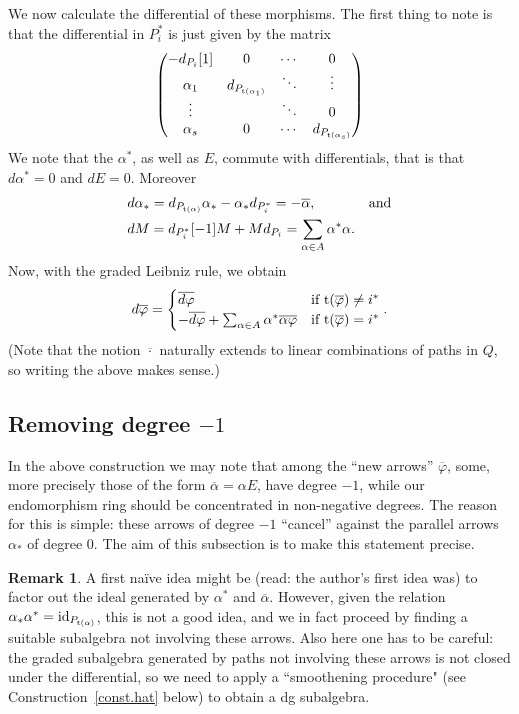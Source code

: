 \documentclass[a4paper,11pt]{amsart}
\theoremstyle{definition}
\newtheorem{remark}[theorem]{Remark}
\DeclareMathOperator{\id}{id}
\newcommand{\tail}{{\rm t}}
\numberwithin{theorem}{section}
\begin{document}
We now calculate the differential of these morphisms. The first thing to note is that the differential in $P_i^*$ is just given by the matrix
\[ \begin{pmatrix} -d_{P_i}[1] & 0 & \cdots & 0 \\ \alpha_1 & d_{P_{\tail(\alpha_1)}} & \ddots & \vdots \\ \vdots && \ddots & 0 \\ \alpha_s & 0 & \cdots & d_{P_{\tail(\alpha_s)}} \end{pmatrix} \]
We note that the $\alpha^*$, as well as $E$, commute with differentials, that is that $d \alpha^* = 0$ and $dE = 0$. Moreover
\begin{align*}
& d \alpha_* = d_{P_{\tail(\alpha)}} \alpha_* - \alpha_* d_{P_i^*} = - \overline{\alpha}, && \text{and} \\
& dM = d_{P_i^*}[-1] M + M d_{P_i} = \sum_{\alpha \in A} \alpha^* \alpha.
\end{align*}
Now, with the graded Leibniz rule, we obtain
\[ d \overline{\varphi} = \begin{cases} \overline{d \varphi} & \text{if } \tail(\overline{\varphi}) \neq i^* \\ - \overline{d\varphi} + \sum_{\alpha \in A} \alpha^* \overline{\alpha \varphi} & \text{if } \tail(\overline{\varphi}) = i^* \end{cases}. \]
(Note that the notion $\overline{\cdot}$ naturally extends to linear combinations of paths in $Q$, so writing the above makes sense.)

\subsection{Removing degree $-1$}

In the above construction we may note that among the ``new arrows'' $\overline{\varphi}$, some, more precisely those of the form $\overline{\alpha} = \alpha E$, have degree $-1$, while our endomorphism ring should be concentrated in non-negative degrees. The reason for this is simple: these arrows of degree $-1$ ``cancel'' against the parallel arrows $\alpha_*$ of degree $0$. The aim of this subsection is to make this statement precise.

\begin{remark}
A first na{\"i}ve idea might be (read: the author's first idea was) to factor out the ideal generated by $\alpha^*$ and $\overline{\alpha}$. However, given the relation $\alpha_* \alpha^* = \id_{P_{\tail(\alpha)}}$, this is not a good idea, and we in fact proceed by finding a suitable subalgebra not involving these arrows. Also here one has to be careful: the graded subalgebra generated by paths not involving these arrows is not closed under the differential, so we need to apply a ``smoothening procedure" (see Construction~\ref{const.hat} below) to obtain a dg subalgebra.
\end{remark}
\end{document}
